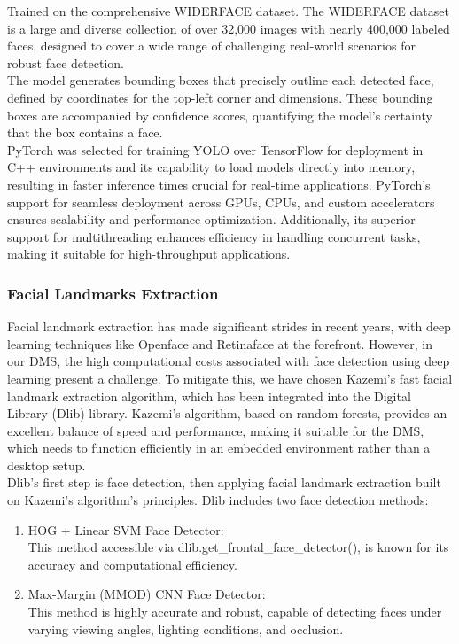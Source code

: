 Trained on the comprehensive WIDERFACE dataset. The WIDERFACE dataset is a large and diverse collection of over 32,000 images with nearly 400,000 labeled faces, designed to cover a wide range of challenging real-world scenarios for robust face detection.\\

The model generates bounding boxes that precisely outline each detected face, defined by coordinates for the top-left corner and dimensions. These bounding boxes are accompanied by confidence scores, quantifying the model's certainty that the box contains a face. \\

PyTorch was selected for training YOLO over TensorFlow for deployment in C++ environments and its capability to load models directly into memory, resulting in faster inference times crucial for real-time applications. PyTorch's support for seamless deployment across GPUs, CPUs, and custom accelerators ensures scalability and performance optimization. Additionally, its superior support for multithreading enhances efficiency in handling concurrent tasks, making it suitable for high-throughput applications.\\

\subsubsection{ Facial Landmarks Extraction}

Facial landmark extraction has made significant strides in recent years, with deep learning techniques like Openface and Retinaface at the forefront. However, in our DMS, the high computational costs associated with face detection using deep learning present a challenge. To mitigate this, we have chosen Kazemi's fast facial landmark extraction algorithm, which has been integrated into the Digital Library (Dlib) library. Kazemi’s algorithm, based on random forests, provides an excellent balance of speed and performance, making it suitable for the DMS, which needs to function efficiently in an embedded environment rather than a desktop setup.\\

Dlib's first step is face detection, then applying facial landmark extraction built on Kazemi's algorithm's principles. Dlib includes two face detection methods:
\begin{enumerate}
    \item HOG + Linear SVM Face Detector: \\
    This method accessible via dlib.get\_frontal\_face\_detector(), is known for its accuracy and computational efficiency.
    \item Max-Margin (MMOD) CNN Face Detector: \\
    This method is highly accurate and robust, capable of detecting faces under varying viewing angles, lighting conditions, and occlusion.
\end{enumerate}

